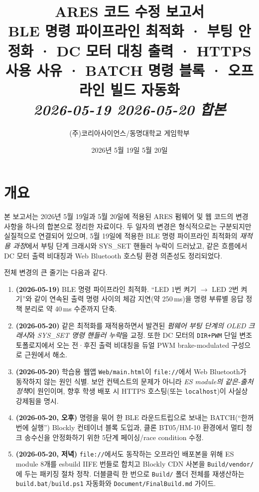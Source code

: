 \documentclass[11pt, oneside]{article}
\title{%
  {\sffamily\bfseries\fontsize{20}{24}\selectfont\color{deepblue}ARES 코드 수정 보고서}\\[4pt]
  {\rmfamily\normalsize\color{accentcopper}BLE 명령 파이프라인 최적화 · 부팅 안정화 · DC 모터 대칭 출력 · HTTPS 사용 사유 · BATCH 명령 블록 · 오프라인 빌드 자동화}\\[2pt]
  {\rmfamily\footnotesize\color{rulegray}\textit{2026-05-19 \textendash{} 2026-05-20 합본}}
}
\author{\sffamily (주)코리아사이언스\quad/\quad 동명대학교 게임학부}
\date{2026년 5월 19일 \textendash{} 5월 20일}
\begin{document}
\maketitle
\thispagestyle{plain}

\section{개요}

본 보고서는 2026년 5월 19일과 5월 20일에 적용된 ARES 펌웨어 및 웹 코드의
변경 사항을 하나의 합본으로 정리한 자료이다. 두 일자의 변경은 형식적으로는
구분되지만 실질적으로 연결되어 있으며, 5월 19일에 적용한 BLE 명령
파이프라인 최적화의 \emph{재적용 과정}에서 부팅 단계 크래시와 SYS\_SET
핸들러 누락이 드러났고, 같은 흐름에서 DC 모터 출력 비대칭과 Web Bluetooth
호스팅 환경 의존성도 정리되었다.

전체 변경의 큰 줄기는 다음과 같다.

\begin{enumerate}
  \item \textbf{(2026-05-19)} BLE 명령 파이프라인 최적화. ``LED 1번 켜기
        $\rightarrow$ LED 2번 켜기''와 같이 연속된 출력 명령 사이의
        체감 지연(약 250\,ms)을 명령 부류별 응답 정책 분리로 약 40\,ms
        수준까지 단축.
  \item \textbf{(2026-05-20)} 같은 최적화를 재적용하면서 발견된 \emph{펌웨어
        부팅 단계의 OLED 크래시}와 \emph{SYS\_SET 명령 핸들러 누락}을
        교정. 또한 DC 모터의 \texttt{DIR+PWM} 단일 변조 토폴로지에서
        오는 전·후진 출력 비대칭을 듀얼 PWM brake-modulated 구성으로
        근원에서 해소.
  \item \textbf{(2026-05-20)} 학습용 웹앱 \texttt{Web/main.html}이
        \texttt{file://}에서 Web Bluetooth가 동작하지 않는 원인 식별.
        보안 컨텍스트의 문제가 아니라 \emph{ES module의 같은-출처
        정책}이 원인이며, 향후 학생 배포 시 HTTPS 호스팅(또는
        \texttt{localhost})이 사실상 강제됨을 명시.
  \item \textbf{(2026-05-20, 오후)} 명령을 묶어 한 BLE 라운드트립으로
        보내는 BATCH(``한꺼번에 실행'') Blockly 컨테이너 블록 도입과,
        클론 BT05/HM-10 환경에서 멀티 청크 송수신을 안정화하기 위한
        5단계 페이싱/race condition 수정.
  \item \textbf{(2026-05-20, 저녁)} \texttt{file://}에서도 동작하는
        오프라인 배포본을 위해 ES module 8개를 esbuild IIFE 번들로
        합치고 Blockly CDN 사본을 \texttt{Build/vendor/}에 두는
        패키징 절차 정착. 더블클릭 한 번으로 \texttt{Build/} 폴더
        전체를 재생산하는 \texttt{build.bat}/\texttt{build.ps1}
        자동화와 \texttt{Document/FinalBuild.md} 가이드.
\end{enumerate}
\end{document}
